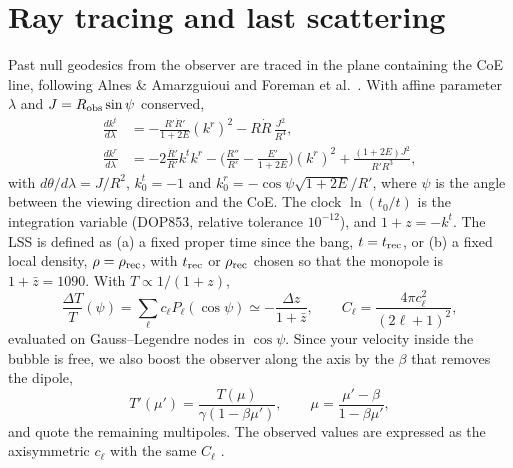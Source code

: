 \documentclass[10pt,twocolumn,letterpaper]{article}
\begin{document}
\section{Ray tracing and last scattering}
Past null geodesics from the observer are traced in the plane containing the CoE line, following Alnes \& Amarzguioui \cite{Alnes2006} and Foreman et al.\ \cite{Foreman2010}. With affine parameter $\lambda$ and $J=R_{\rm obs}\sin\psi$ conserved,
\begin{equation}\label{eq:geo}
\begin{aligned}
\frac{dk^t}{d\lambda}&=-\frac{R'\dot R'}{1+2E}(k^r)^2-R\dot R\,\frac{J^2}{R^4},\\
\frac{dk^r}{d\lambda}&=-2\frac{\dot R'}{R'}k^tk^r-\Big(\frac{R''}{R'}-\frac{E'}{1+2E}\Big)(k^r)^2+\frac{(1+2E)J^2}{R'R^3},
\end{aligned}
\end{equation}
with $d\theta/d\lambda=J/R^2$, $k^t_0=-1$ and $k^r_0=-\cos\psi\sqrt{1+2E}/R'$, where $\psi$ is the angle between the viewing direction and the CoE. The clock $\ln(t_0/t)$ is the integration variable (DOP853, relative tolerance $10^{-12}$), and $1+z=-k^t$. The LSS is defined as (a) a fixed proper time since the bang, $t=t_{\rm rec}$, or (b) a fixed local density, $\rho=\rho_{\rm rec}$, with $t_{\rm rec}$ or $\rho_{\rm rec}$ chosen so that the monopole is $1+\bar z=1090$. With $T\propto1/(1+z)$,
\begin{equation}\label{eq:leg}
\frac{\Delta T}{T}(\psi)=\sum_\ell c_\ell P_\ell(\cos\psi)\simeq-\frac{\Delta z}{1+\bar z},\qquad C_\ell=\frac{4\pi c_\ell^2}{(2\ell+1)^2},
\end{equation}
evaluated on Gauss--Legendre nodes in $\cos\psi$. Since your velocity inside the bubble is free, we also boost the observer along the axis by the $\beta$ that removes the dipole,
\begin{equation}\label{eq:boost}
T'(\mu')=\frac{T(\mu)}{\gamma(1-\beta\mu')},\qquad \mu=\frac{\mu'-\beta}{1-\beta\mu'},
\end{equation}
and quote the remaining multipoles. The observed values are expressed as the axisymmetric $c_\ell$ with the same $C_\ell$ \cite{Planck2018I,Planck2018V}.
\end{document}
